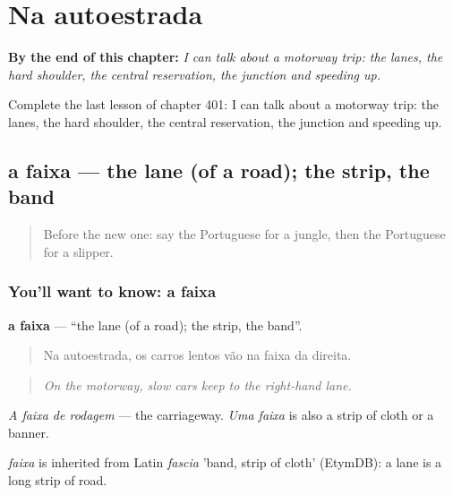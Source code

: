 
\chapter{Na autoestrada}
\label{ch:pt-na-autoestrada}

\begin{chapteropening}
\textbf{By the end of this chapter:} \emph{I can talk about a motorway trip: the lanes, the hard shoulder, the central reservation, the junction and speeding up.}

Complete the last lesson of chapter 401: I can talk about a motorway trip: the lanes, the hard shoulder, the central reservation, the junction and speeding up.
\end{chapteropening}

\section[a faixa]{a faixa — the lane (of a road); the strip, the band}

\label{lesson:PT-C401-faixa}



\begin{quote}
Before the new one: say the Portuguese for a jungle, then the Portuguese for a slipper.
\end{quote}

\subsection*{You'll want to know: a faixa}
\textbf{a faixa} — \textquotedblleft{}the lane (of a road); the strip, the band\textquotedblright{}.

\begin{quote}
Na autoestrada, os carros lentos vão na faixa da direita.
\end{quote}

\begin{quote}
\emph{On the motorway, slow cars keep to the right-hand lane.}
\end{quote}

\emph{A faixa de rodagem} — the carriageway. \emph{Uma faixa} is also a strip of cloth or a banner.

\begin{cousinweb}
\emph{faixa} is inherited from Latin \emph{fascia} 'band, strip of cloth' (EtymDB): a lane is a long strip of road.
\end{cousinweb}

